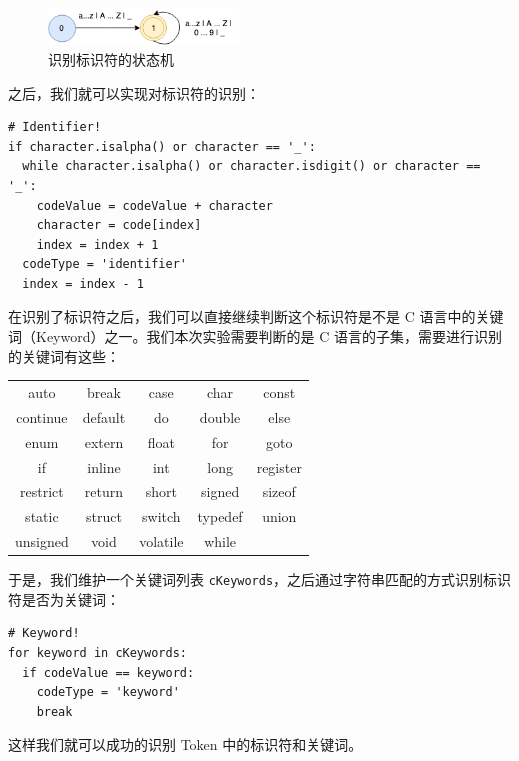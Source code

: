 \documentclass[UTF8]{ctexart}
\begin{document}
\begin{figure}[h]
  \centering
  \includegraphics[width=0.45\textwidth]{images/identifier.png}
  \caption{识别标识符的状态机}
  \label{fig:2}
\end{figure}

之后，我们就可以实现对标识符的识别：

\begin{verbatim}
# Identifier!
if character.isalpha() or character == '_':
  while character.isalpha() or character.isdigit() or character == '_':
    codeValue = codeValue + character
    character = code[index]
    index = index + 1
  codeType = 'identifier'
  index = index - 1
\end{verbatim}

在识别了标识符之后，我们可以直接继续判断这个标识符是不是 C 语言中的关键词（Keyword）之一。我们本次实验需要判断的是 C 语言的子集，需要进行识别的关键词有这些：

\begin{center}
  \captionsetup{position=above}
  \begin{tabular}{c|c|c|c|c}
    \hline
    auto & break & case & char & const \\
    continue & default & do & double & else \\
    enum & extern & float & for & goto \\
    if & inline & int & long & register \\
    restrict & return & short & signed & sizeof \\
    static & struct & switch & typedef & union \\
    unsigned & void & volatile & while \\
    \hline
  \end{tabular}
\end{center}

于是，我们维护一个关键词列表 \texttt{cKeywords}，之后通过字符串匹配的方式识别标识符是否为关键词：

\begin{verbatim}
# Keyword!
for keyword in cKeywords:
  if codeValue == keyword:
    codeType = 'keyword'
    break
\end{verbatim}

这样我们就可以成功的识别 Token 中的标识符和关键词。
\end{document}
